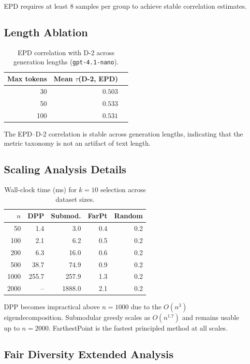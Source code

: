 \documentclass[11pt]{article}
\begin{document}
EPD requires at least 8 samples per group to achieve stable
correlation estimates.

\subsection{Length Ablation}

\begin{table}[H]
\centering
\caption{EPD correlation with D-2 across generation lengths
(\texttt{gpt-4.1-nano}).}
\begin{tabular}{rrr}
\toprule
Max tokens & Mean $\tau$(D-2, EPD) \\
\midrule
30  & $0.503$ \\
50  & $0.533$ \\
100 & $0.531$ \\
\bottomrule
\end{tabular}
\end{table}

The EPD--D-2 correlation is stable across generation lengths,
indicating that the metric taxonomy is not an artifact of text length.

\subsection{Scaling Analysis Details}

\begin{table}[H]
\centering
\caption{Wall-clock time (ms) for $k=10$ selection across dataset sizes.}
\begin{tabular}{rrrrr}
\toprule
$n$ & DPP & Submod. & FarPt & Random \\
\midrule
50   & 1.4 & 3.0 & 0.4 & 0.2 \\
100  & 2.1 & 6.2 & 0.5 & 0.2 \\
200  & 6.3 & 16.0 & 0.6 & 0.2 \\
500  & 38.7 & 74.9 & 0.9 & 0.2 \\
1000 & 255.7 & 257.9 & 1.3 & 0.2 \\
2000 & -- & 1888.0 & 2.1 & 0.2 \\
\bottomrule
\end{tabular}
\end{table}

DPP becomes impractical above $n = 1000$ due to the $O(n^3)$
eigendecomposition. Submodular greedy scales as $O(n^{1.7})$
and remains usable up to $n = 2000$. FarthestPoint is the
fastest principled method at all scales.

\subsection{Fair Diversity Extended Analysis}
\end{document}
